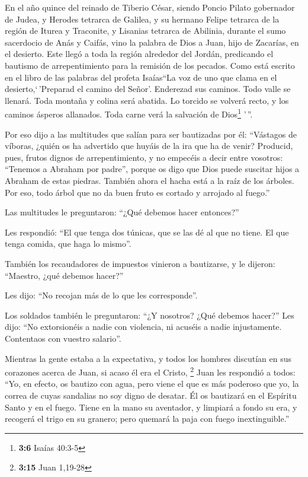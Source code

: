 En el año quince del reinado de Tiberio César, siendo
Poncio Pilato gobernador de Judea, y Herodes tetrarca de Galilea, y su
hermano Felipe tetrarca de la región de Iturea y Traconite, y Lisanias
tetrarca de Abilinia,  durante el sumo sacerdocio de Anás
y Caifás, vino la palabra de Dios a Juan, hijo de Zacarías, en el
desierto.  Este llegó a toda la región alrededor del
Jordán, predicando el bautismo de arrepentimiento para la remisión de
los pecados.  Como está escrito en el libro de las
palabras del profeta Isaías``La voz de uno que clama en el
desierto,`\,'Preparad el camino del Señor'. Enderezad sus caminos.
 Todo valle se llenará. Toda montaña y colina será
abatida. Lo torcido se volverá recto, y los caminos ásperos allanados.
 Toda carne verá la salvación de Dios\footnote{\textbf{3:6}
  Isaías 40:3-5} '\,''.

 Por eso dijo a las multitudes que salían para ser
bautizadas por él: ``Vástagos de víboras, ¿quién os ha advertido que
huyáis de la ira que ha de venir?  Producid, pues, frutos
dignos de arrepentimiento, y no empecéis a decir entre vosotros:
``Tenemos a Abraham por padre'', porque os digo que Dios puede suscitar
hijos a Abraham de estas piedras.  También ahora el hacha
está a la raíz de los árboles. Por eso, todo árbol que no da buen fruto
es cortado y arrojado al fuego.''

 Las multitudes le preguntaron: ``¿Qué debemos hacer
entonces?''

 Les respondió: ``El que tenga dos túnicas, que se las dé
al que no tiene. El que tenga comida, que haga lo mismo''.

 También los recaudadores de impuestos vinieron a
bautizarse, y le dijeron: ``Maestro, ¿qué debemos hacer?''

 Les dijo: ``No recojan más de lo que les corresponde''.

 Los soldados también le preguntaron: ``¿Y nosotros? ¿Qué
debemos hacer?'' Les dijo: ``No extorsionéis a nadie con violencia, ni
acuséis a nadie injustamente. Contentaos con vuestro salario''.

 Mientras la gente estaba a la expectativa, y todos los
hombres discutían en sus corazones acerca de Juan, si acaso él era el
Cristo, \footnote{\textbf{3:15} Juan 1,19-28}  Juan les
respondió a todos: ``Yo, en efecto, os bautizo con agua, pero viene el
que es más poderoso que yo, la correa de cuyas sandalias no soy digno de
desatar. Él os bautizará en el Espíritu Santo y en el fuego.
 Tiene en la mano su aventador, y limpiará a fondo su
era, y recogerá el trigo en su granero; pero quemará la paja con fuego
inextinguible.''


